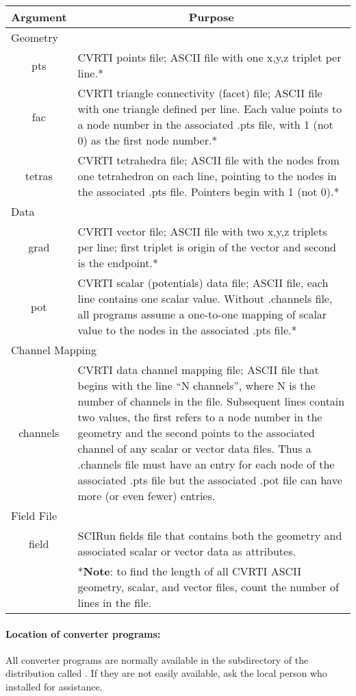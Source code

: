 \begin{center}
\begin{tabular}{|c|p{4in}|} \hline
\multicolumn{1}{|c|}{Argument} &
\multicolumn{1}{|c|}{Purpose} \\ \hline
\multicolumn{2}{|l|}{Geometry} \\ \hline
pts & CVRTI points file; ASCII file with one x,y,z triplet per line.*\\
fac & CVRTI triangle connectivity (facet) file; ASCII file with one
    triangle defined per line.  Each value points to a node number in the
    associated .pts file, with 1 (not 0) as the first node number.*  \\
tetras & CVRTI tetrahedra file; ASCII file with the nodes from one
    tetrahedron on each line, pointing to the nodes in the associated .pts
    file.  Pointers begin with 1 (not 0).*\\ \hline
\multicolumn{2}{|l|}{Data} \\ \hline
grad & CVRTI vector file; ASCII file with two x,y,z triplets per line;
    first triplet is origin of the vector and second is the endpoint.*\\
pot & CVRTI scalar (potentials) data file; ASCII file,  each line contains
    one scalar value.  Without .channels file, all programs assume a
    one-to-one mapping of scalar value to the  nodes in the associated .pts
    file.*\\ \hline
\multicolumn{2}{|l|}{Channel Mapping} \\ \hline
channels & CVRTI data channel mapping file; ASCII file that begins with the
    line ``N channels'', where N is the number of channels in the file.
    Subsequent lines contain two values, the first refers to a node number in
    the geometry and the second points to the associated channel of any scalar
    or vector data files.  Thus a .channels file must have an entry for each
    node of the associated .pts file but the associated .pot file can have more
    (or even fewer) entries.\\ \hline
\multicolumn{2}{|l|}{Field File} \\ \hline
field & SCIRun fields file that contains both the geometry and associated
    scalar or vector data as attributes. \\ \hline
& *\textbf{Note}: to find the length of all CVRTI ASCII geometry,
scalar, and vector files, count the number of lines in the file. \\
\hline
\end{tabular}
\end{center}

\paragraph{Location of converter programs:}
All converter programs are normally available in the subdirectory of the
\sr{} distribution called .  If they are
not easily available, ask the local person who installed \sr{} for
assistance.
